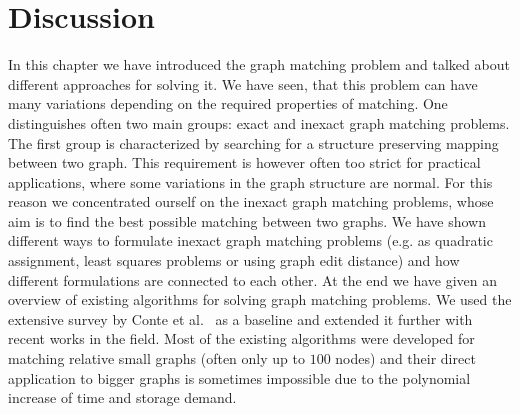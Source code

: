 
\section{Discussion}
In this chapter we have introduced the graph matching problem and talked about different approaches for solving it. We have seen, that this problem can have many variations depending on the required properties of matching. One distinguishes often two main groups: exact and inexact graph matching problems. The first group is characterized by searching for a structure preserving mapping between two graph. This requirement is however often too strict for practical applications, where some variations in the graph structure are normal. For this reason we concentrated ourself on the inexact graph matching problems, whose aim is to find the best possible matching between two graphs. We have shown different ways to formulate inexact graph matching problems (e.g. as quadratic assignment, least squares problems or using graph edit distance) and how different formulations are connected to each other. At the end we have given an overview of existing algorithms for solving graph matching problems. We used the extensive survey by Conte et al.~\cite{Conte2004} as a baseline and extended it further with recent works in the field. Most of the existing algorithms were developed for matching relative small graphs (often only up to $100$ nodes) and their direct application to bigger graphs is sometimes impossible due to the polynomial increase of time and storage demand. 
